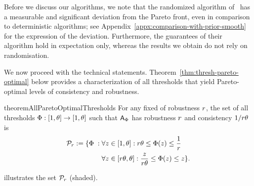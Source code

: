 

Before we discuss our algorithms, we note that the randomized algorithm of~\cite{benomar2025tradeoffs} has a measurable and significant deviation from the Pareto front, even in comparison to deterministic algorithms; see Appendix~\ref{appx:comparison-with-prior-smooth} for the expression of the deviation. Furthermore, the guarantees of their algorithm hold in expectation only, whereas the results we obtain do not rely on randomisation.


We now proceed with the technical statements. 
Theorem~\ref{thm:thresh-pareto-optimal} below provides a characterization of all thresholds that yield Pareto-optimal levels of consistency and robustness.

\begin{restatable}{theorem}{AllParetoOptimalThresholds}\label{thm:thresh-pareto-optimal}
For any fixed of robustness $r$, the set of all thresholds $\Phi: [1,\theta] \to [1,\theta]$ such that $\mbox{\textup{\textsf{A}}}_\Phi$ has robustness $r$ and consistency $1/r\theta$ is 
\begin{align*}
\mathcal{P}_r := \{ \Phi  \;:\;
&\forall z \in [1,\theta]: r \theta \leq \Phi(z) \leq \frac{1}{r}\\
&\forall z \in [r \theta,\theta]: \frac{z}{r \theta} \leq \Phi(z) \leq z \}.
\end{align*}
\end{restatable}
 illustrates the set $\mathcal{P}_r$ (shaded).







